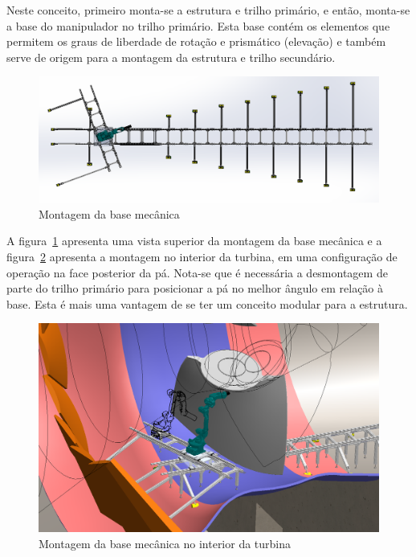 Neste conceito, primeiro monta-se a estrutura e trilho
primário, e então, monta-se a base do manipulador no trilho primário. Esta base
contém os elementos que permitem os graus de liberdade de rotação e prismático
(elevação) e também serve de origem para a montagem da estrutura e trilho
secundário. 

\begin{figure}[h!]
	\centering
	\includegraphics[width=0.9\columnwidth]{figs/construcao/EMMA_Base_Secundaria_04}
	\caption{Montagem da base mecânica}
    \label{fig::EMMA_Base_Secundaria_04}
\end{figure}

A figura~\ref{fig::EMMA_Base_Secundaria_04} apresenta uma vista superior da
montagem da base mecânica e a figura~\ref{fig::EMMA_Base_Secundaria_01}
apresenta a montagem no interior da turbina, em uma configuração de operação na
face posterior da pá. Nota-se que é necessária a desmontagem de parte do trilho
primário para posicionar a pá no melhor ângulo em relação à base. Esta é mais
uma vantagem de se ter um conceito modular para a estrutura.

\begin{figure}[h!]
	\centering
	\includegraphics[width=0.9\columnwidth]{figs/construcao/EMMA_Base_Secundaria_01}
	\caption{Montagem da base mecânica no interior da turbina}
    \label{fig::EMMA_Base_Secundaria_01}
\end{figure}

